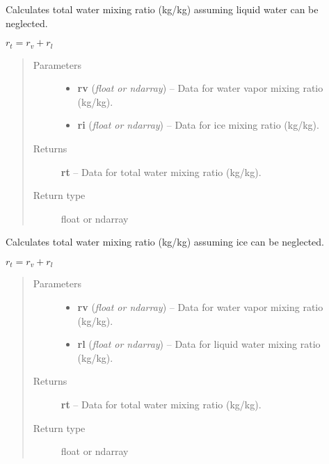 \documentclass[letterpaper,10pt,english]{sphinxmanual}
\begin{document}

\begin{fulllineitems}
\label{atmos:atmos.equations.rt_from_rv_ri}
Calculates total water mixing ratio (kg/kg) assuming liquid water can be
neglected.

\(r_t = r_v+r_l\)
\begin{quote}\begin{description}
\item[{Parameters}] \leavevmode\begin{itemize}
\item {} 
\textbf{rv} (\emph{float or ndarray}) -- Data for water vapor mixing ratio (kg/kg).

\item {} 
\textbf{ri} (\emph{float or ndarray}) -- Data for ice mixing ratio (kg/kg).

\end{itemize}

\item[{Returns}] \leavevmode
\textbf{rt} --
Data for total water mixing ratio (kg/kg).

\item[{Return type}] \leavevmode
float or ndarray

\end{description}\end{quote}

\end{fulllineitems}


\begin{fulllineitems}
\label{atmos:atmos.equations.rt_from_rv_rl}
Calculates total water mixing ratio (kg/kg) assuming ice can be neglected.

\(r_t = r_v+r_l\)
\begin{quote}\begin{description}
\item[{Parameters}] \leavevmode\begin{itemize}
\item {} 
\textbf{rv} (\emph{float or ndarray}) -- Data for water vapor mixing ratio (kg/kg).

\item {} 
\textbf{rl} (\emph{float or ndarray}) -- Data for liquid water mixing ratio (kg/kg).

\end{itemize}

\item[{Returns}] \leavevmode
\textbf{rt} --
Data for total water mixing ratio (kg/kg).

\item[{Return type}] \leavevmode
float or ndarray

\end{description}\end{quote}

\end{fulllineitems}
\end{document}
